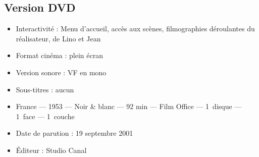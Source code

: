 \subsection*{Version DVD}

\begin{itemize}
	\item Interactivité : Menu d'accueil, accès aux scènes, filmographies
	déroulantes du réalisateur, de Lino  et Jean
	\item Format cinéma : plein écran
	\item Version sonore : VF en mono
	\item Sous-titres : aucun
	\item France --- 1953 --- Noir \& blanc --- 92 min --- Film Office --- 1~disque --- 1~face --- 1~couche
	\item Date de parution : 19 septembre 2001
	\item Éditeur : Studio Canal
\end{itemize}

